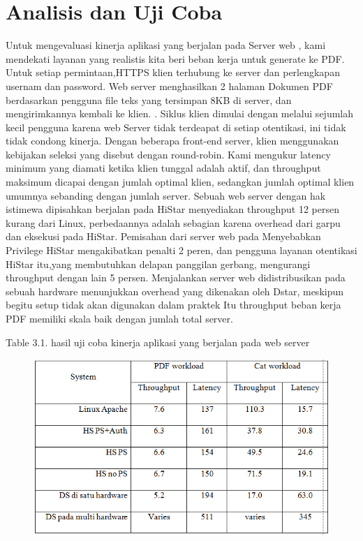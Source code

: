 \documentclass{jtetiproposalskripsi}
\begin{document}
\section{Analisis dan Uji Coba}
Untuk mengevaluasi kinerja aplikasi yang berjalan pada
Server web , kami mendekati layanan yang realistis kita beri beban kerja untuk generate ke PDF. Untuk setiap permintaan,HTTPS klien terhubung ke server dan perlengkapan usernam dan password. Web server menghasilkan 2 halaman Dokumen PDF berdasarkan pengguna file teks yang tersimpan 8KB di server, dan mengirimkannya kembali ke klien. . Siklus klien dimulai dengan melalui sejumlah kecil pengguna karena web
Server tidak terdeapat di setiap otentikasi, ini tidak
tidak condong kinerja. Dengan beberapa front-end server,
klien menggunakan kebijakan seleksi yang disebut dengan round-robin. Kami mengukur latency minimum yang diamati ketika klien tunggal adalah aktif, dan throughput maksimum dicapai dengan
jumlah optimal klien, sedangkan jumlah optimal klien umumnya sebanding dengan jumlah server. Sebuah web server dengan hak  istimewa dipisahkan berjalan pada HiStar menyediakan throughput 12 persen kurang dari Linux, perbedaannya adalah sebagian karena overhead dari garpu dan eksekusi pada HiStar. Pemisahan dari server web pada Menyebabkan Privilege HiStar mengakibatkan penalti 2 peren, dan pengguna layanan otentikasi HiStar itu,yang membutuhkan delapan panggilan gerbang, mengurangi throughput dengan lain 5 persen. Menjalankan server web didistribusikan pada sebuah hardware  menunjukkan overhead yang dikenakan oleh Dstar, meskipun begitu setup tidak akan digunakan dalam praktek Itu throughput beban kerja PDF memiliki skala baik dengan jumlah total server.
\begin{center}
Table 3.1. hasil uji coba kinerja aplikasi yang berjalan pada web server
\end{center}

\begin{figure}[ht!]
  \centering
    \includegraphics{gambar/tabel}
    \caption{}
    \label{star}
\end{figure}
\end{document}
